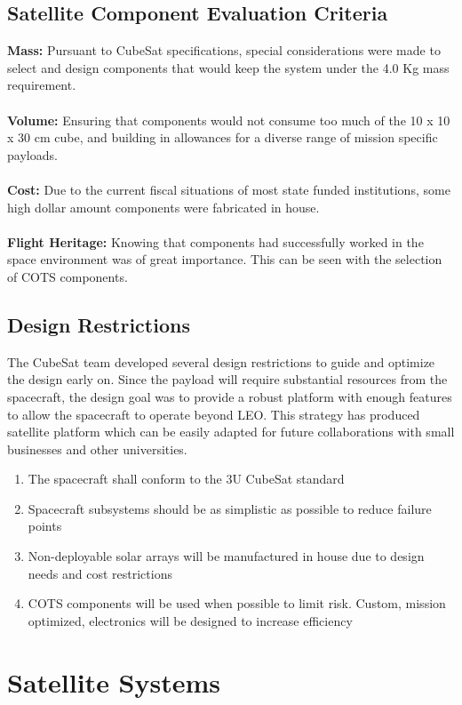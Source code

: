 \documentclass[nocover]            %
{CSLI}                       %
\begin{document}
\subsection{Satellite Component Evaluation Criteria}
\textbf{Mass:} Pursuant to CubeSat specifications, special considerations were made to select and design components that would keep the system under the 4.0 Kg mass requirement.\\ 
\\\textbf{Volume:} Ensuring that components would not consume too much of the 10 x 10 x 30 cm cube, and building in allowances for a diverse range of mission specific payloads. \\
\\\textbf{Cost:} Due to the current fiscal situations of most state funded institutions, some high dollar amount components were fabricated in house. \\
\\\textbf{Flight Heritage:} Knowing that components had successfully worked in the space environment was of great importance. This can be seen with the selection of COTS components.\\ 
\subsection{Design Restrictions}
The CubeSat team developed several design restrictions to guide and optimize the design early on. Since the payload will require substantial resources from the spacecraft, the design goal was to provide a robust platform with enough features to allow the spacecraft to operate beyond LEO. This strategy has produced satellite platform which can be easily adapted for future collaborations with small businesses and other universities. 
\begin{enumerate}
\item The spacecraft shall conform to the 3U CubeSat standard
\item Spacecraft subsystems should be as simplistic as possible to reduce failure points 
\item Non-deployable solar arrays will be manufactured in house due to design needs and cost restrictions 
\item COTS components will be used when possible to limit risk. Custom, mission optimized, electronics will be designed to increase efficiency
\end{enumerate}

\newpage
\section{Satellite Systems}
\end{document}
